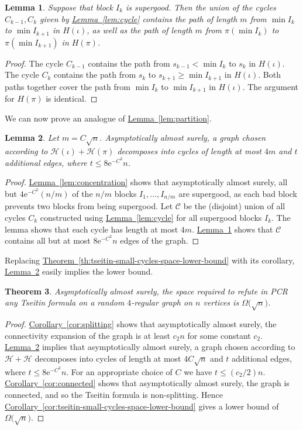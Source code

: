 \documentclass[11pt]{article}
\numberwithin{equation}{section}
\newtheorem{theorem}{Theorem}[section]
\newtheorem{lemma}[theorem]{Lemma}
\theoremstyle{definition}
\theoremstyle{plain}
\newcommand{\eee}{\mathrm e}
\newcommand{\expref}[2]{\hyperref[#2]{#1~\ref{#2}}}
\theoremstyle{plain}
\theoremstyle{definition}
\newcommand{\Bigomega}[1]{\Omega \bigl( #1 \bigr)}
\newcommand{\probspace}{\mathcal}
\newcommand{\psHam}{\probspace{H}}
\newcommand{\Gnonsplittingnot}{non-splitting\xspace}
\begin{document}
\begin{lemma} \label{lem:supergood}
 Suppose that block $I_k$ is supergood. Then the union of the cycles $C_{k-1},C_k$ given by \expref{Lemma}{lem:cycle} contains the path of length $m$ from $\min I_k$ to $\min I_{k+1}$ in $H(\iota)$, as well as the path of length $m$ from $\pi(\min I_k)$ to $\pi(\min I_{k+1})$ in $H(\pi)$.
\end{lemma}
\begin{proof}
 The cycle $C_{k-1}$ contains the path from $s_{k-1} < \min I_k$ to $s_k$ in $H(\iota)$. The cycle $C_k$ contains the path from $s_k$ to $s_{k+1} \geq \min I_{k+1}$ in $H(\iota)$. Both paths together cover the path from $\min I_k$ to $\min I_{k+1}$ in $H(\iota)$. The argument for $H(\pi)$ is identical.
\end{proof}

We can now prove an analogue of \expref{Lemma}{lem:partition}.

\begin{lemma} \label{lem:almost-partition}
 Let $m = C\sqrt{n}$. Asymptotically almost surely, a graph chosen according to $\psHam(\iota) + \psHam(\pi)$ decomposes into cycles of %
 length at most $4m$ and $t$ additional edges, where $t \leq 8\eee^{-C^2}n$.
\end{lemma}
\begin{proof}
 \expref{Lemma}{lem:concentration} shows that asymptotically almost surely, all but $4\eee^{-C^2} (n/m)$ of the $n/m$ blocks $I_1,\ldots,I_{n/m}$ are supergood, as each bad block prevents two blocks from being supergood. Let $\mathcal{C}$ be the (disjoint) union of all cycles $C_k$ constructed using \expref{Lemma}{lem:cycle} for all supergood blocks $I_k$. The lemma shows that each cycle has %
 length at most $4m$. \expref{Lemma}{lem:supergood} shows that $\mathcal{C}$ contains all but at most $8\eee^{-C^2} n$ edges of the graph.
\end{proof}

Replacing \expref{Theorem}{th:tseitin-small-cycles-space-lower-bound} with its corollary, \expref{Lemma}{lem:almost-partition} easily implies the lower bound.

\begin{theorem} \label{thm:improved}
 Asymptotically almost surely, the space required to refute in PCR any Tseitin formula on a random $4$-regular graph on $n$ vertices is $\Bigomega{\sqrt{n}}$.
\end{theorem}
\begin{proof}
  \expref{Corollary}{cor:splitting} shows that asymptotically almost surely, the connectivity expansion of the graph is at least $c_2 n$ %
  for some constant $c_2$. %
  \expref{Lemma}{lem:almost-partition} implies that asymptotically almost surely, a graph chosen according to $\psHam + \psHam$ decomposes into cycles of %
 length at most $4C\sqrt{n}$ and $t$ additional edges, where $t \leq 8\eee^{-C^2}n$. For an appropriate choice of $C$ we have $t \leq (c_2/2)n$.
 \expref{Corollary}{cor:connected} shows that asymptotically almost surely, the graph is connected, and so the Tseitin formula is \Gnonsplittingnot.
 Hence \expref{Corollary}{cor:tseitin-small-cycles-space-lower-bound} gives a lower bound of $\Bigomega{\sqrt{n}}$.
\end{proof}
\end{document}

